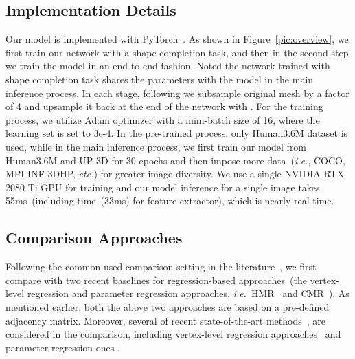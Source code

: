 \documentclass[sigplan]{acmart}
\def\ie{\emph{i.e.}}
\def\etc{\emph{etc.}}
\begin{document}
\subsection{Implementation Details}
\label{subsec:implement}
Our model is implemented with PyTorch~\cite{paszke2017automatic}. As shown in Figure~\ref{pic:overview}, we first train our network with a shape completion task, and then in the second step we train the model in an end-to-end fashion. Noted the network trained with shape completion task shares the parameters with the model in the main inference process. In each stage, following \cite{kolotouros2019convolutional} we subsample original mesh by a factor of 4 and upsample it back at the end of the network with \cite{GenerateFaceEccv18}. For the training process, we utilize Adam optimizer with a mini-batch size of 16, where the learning set is set to 3e-4. In the pre-trained process, only Human3.6M dataset is used, while in the main inference process, we first train our model from Human3.6M and UP-3D for 30 epochs and then impose more data~(\ie, COCO, MPI-INF-3DHP, \etc) for greater image diversity. We use a single NVIDIA RTX 2080 Ti GPU for training and our model inference for a single image takes 55ms~(including time~(33ms) for feature extractor), which is nearly real-time.

\subsection{Comparison Approaches}
\label{subsec:comApp}
Following the common-used comparison setting in the literature~\cite{Choi_2020_ECCV_Pose2Mesh,kocabas2019vibe,DenseCorrespondence}, we first compare with two recent baselines for regression-based approaches~(the vertex-level regression and parameter regression approaches, \ie~HMR~\cite{kanazawa2018end-to-end} and CMR~\cite{kolotouros2019convolutional}). As mentioned earlier, both the above two approaches are based on a pre-defined adjacency matrix. Moreover, several of recent state-of-the-art methods~\cite{KanazawaVideo,arnab2019exploiting,pavlakos2019texturepose,kolotouros2019spin,jiang2020coherent,kundu_human_mesh,acmmm19_danet,kolotouros2019convolutional,DenseCorrespondence}, are considered in the comparison, including vertex-level regression approaches~\cite{kolotouros2019convolutional,DenseCorrespondence} and parameter regression ones
\cite{kanazawa2018end-to-end,kolotouros2019spin}.
\end{document}
